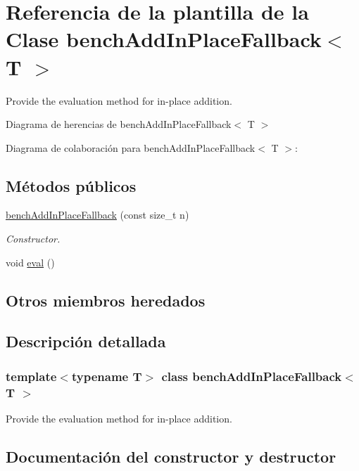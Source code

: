 \hypertarget{classbenchAddInPlaceFallback}{}\section{Referencia de la plantilla de la Clase bench\+Add\+In\+Place\+Fallback$<$ T $>$}
\label{classbenchAddInPlaceFallback}


Provide the evaluation method for in-\/place addition.  




Diagrama de herencias de bench\+Add\+In\+Place\+Fallback$<$ T $>$


Diagrama de colaboración para bench\+Add\+In\+Place\+Fallback$<$ T $>$\+:
\subsection*{Métodos públicos}
\begin{DoxyCompactItemize}
\item 
\hyperlink{classbenchAddInPlaceFallback_a328e0e7e740a4cec03a9ebf47bb53b43}{bench\+Add\+In\+Place\+Fallback} (const size\+\_\+t n)
\begin{DoxyCompactList}\small\item\em Constructor. \end{DoxyCompactList}\item 
void \hyperlink{classbenchAddInPlaceFallback_ac2857d6a2cae1f4b0a3ec449164b968b}{eval} ()
\end{DoxyCompactItemize}
\subsection*{Otros miembros heredados}


\subsection{Descripción detallada}
\subsubsection*{template$<$typename T$>$\newline
class bench\+Add\+In\+Place\+Fallback$<$ T $>$}

Provide the evaluation method for in-\/place addition. 

\subsection{Documentación del constructor y destructor}
\mbox{\label{classbenchAddInPlaceFallback_a328e0e7e740a4cec03a9ebf47bb53b43}} 
